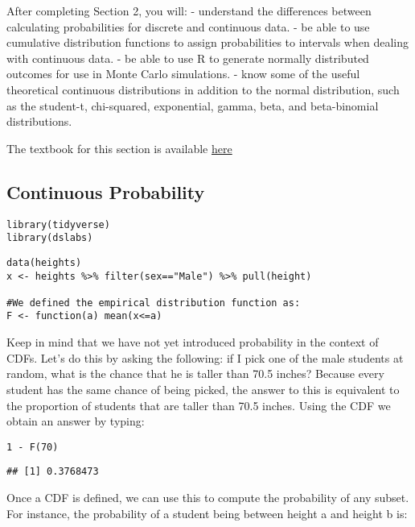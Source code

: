 \documentclass[
]{article}
\begin{document}
After completing Section 2, you will: - understand the differences
between calculating probabilities for discrete and continuous data. - be
able to use cumulative distribution functions to assign probabilities to
intervals when dealing with continuous data. - be able to use R to
generate normally distributed outcomes for use in Monte Carlo
simulations. - know some of the useful theoretical continuous
distributions in addition to the normal distribution, such as the
student-t, chi-squared, exponential, gamma, beta, and beta-binomial
distributions.

The textbook for this section is available
\href{https://rafalab.github.io/dsbook/probability.html\#continuous-probability}{here}

\hypertarget{continuous-probability}{%
\subsection{Continuous Probability}\label{continuous-probability}}

\begin{verbatim}
library(tidyverse)
library(dslabs)
\end{verbatim}

\begin{verbatim}
data(heights)
x <- heights %>% filter(sex=="Male") %>% pull(height)

#We defined the empirical distribution function as:
F <- function(a) mean(x<=a)
\end{verbatim}

Keep in mind that we have not yet introduced probability in the context
of CDFs. Let's do this by asking the following: if I pick one of the
male students at random, what is the chance that he is taller than 70.5
inches? Because every student has the same chance of being picked, the
answer to this is equivalent to the proportion of students that are
taller than 70.5 inches. Using the CDF we obtain an answer by typing:

\begin{verbatim}
1 - F(70)
\end{verbatim}

\begin{verbatim}
## [1] 0.3768473
\end{verbatim}

Once a CDF is defined, we can use this to compute the probability of any
subset. For instance, the probability of a student being between height
a and height b is:
\end{document}
